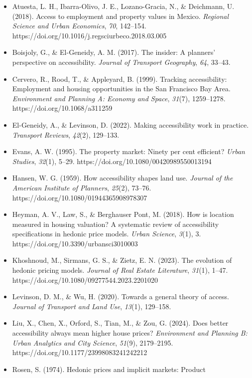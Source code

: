 \documentclass[
  12pt,
]{report}
\begin{document}
\begin{itemize}
\item
  Atuesta, L. H., Ibarra-Olivo, J. E., Lozano-Gracia, N., \& Deichmann,
  U. (2018). Access to employment and property values in Mexico.
  \emph{Regional Science and Urban Economics}, \emph{70}, 142--154.
  https://doi.org/10.1016/j.regsciurbeco.2018.03.005
\item
  Boisjoly, G., \& El-Geneidy, A. M. (2017). The insider: A planners'
  perspective on accessibility. \emph{Journal of Transport Geography},
  \emph{64}, 33--43.
\item
  Cervero, R., Rood, T., \& Appleyard, B. (1999). Tracking
  accessibility: Employment and housing opportunities in the San
  Francisco Bay Area. \emph{Environment and Planning A: Economy and
  Space}, \emph{31}(7), 1259--1278. https://doi.org/10.1068/a311259
\item
  El-Geneidy, A., \& Levinson, D. (2022). Making accessibility work in
  practice. \emph{Transport Reviews}, \emph{42}(2), 129--133.
\item
  Evans, A. W. (1995). The property market: Ninety per cent efficient?
  \emph{Urban Studies}, \emph{32}(1), 5--29.
  https://doi.org/10.1080/00420989550013194
\item
  Hansen, W. G. (1959). How accessibility shapes land use. \emph{Journal
  of the American Institute of Planners}, \emph{25}(2), 73--76.
  https://doi.org/10.1080/01944365908978307
\item
  Heyman, A. V., Law, S., \& Berghauser Pont, M. (2018). How is location
  measured in housing valuation? A systematic review of accessibility
  specifications in hedonic price models. \emph{Urban Science},
  \emph{3}(1), 3. https://doi.org/10.3390/urbansci3010003
\item
  Khoshnoud, M., Sirmans, G. S., \& Zietz, E. N. (2023). The evolution
  of hedonic pricing models. \emph{Journal of Real Estate Literature},
  \emph{31}(1), 1--47. https://doi.org/10.1080/09277544.2023.2201020
\item
  Levinson, D. M., \& Wu, H. (2020). Towards a general theory of access.
  \emph{Journal of Transport and Land Use}, \emph{13}(1), 129--158.
\item
  Liu, X., Chen, X., Orford, S., Tian, M., \& Zou, G. (2024). Does
  better accessibility always mean higher house prices?
  \emph{Environment and Planning B: Urban Analytics and City Science},
  \emph{51}(9), 2179--2195. https://doi.org/10.1177/23998083241242212
\item
  Rosen, S. (1974). Hedonic prices and implicit markets: Product

\end{itemize}
\end{document}
